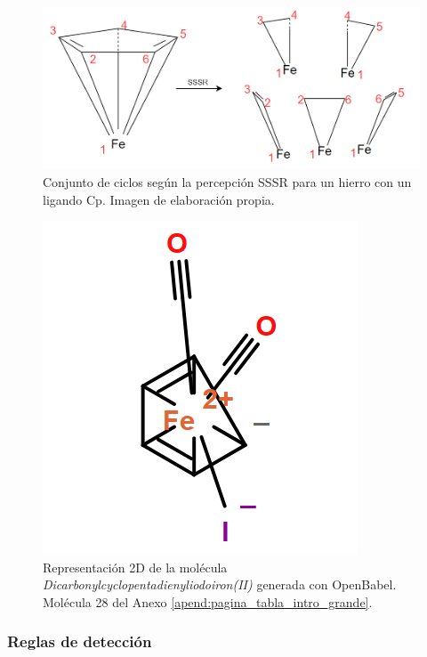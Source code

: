 \begin{figure}[h!]
    \centering
    \includegraphics[scale=0.4]{imagenes/diseno/dibujo/sssr_iron.png}
    \caption{Conjunto de ciclos según la percepción SSSR para un hierro con un ligando Cp. Imagen de elaboración propia.}
    \label{fig:sssr_iron(II)}
\end{figure}


\begin{figure}[h!]
    \centering
    \includegraphics[scale=0.5]{imagenes/diseno/dibujo/iron(II)_Original.png}
    \caption{Representación 2D de la molécula \textit{Dicarbonylcyclopentadienyliodoiron(II)} generada con OpenBabel. Molécula 28 del Anexo \ref{apend:pagina_tabla_intro_grande}.}
    \label{fig:iron(II)Original}
\end{figure}

\subsubsection{Reglas de detección} \label{reglas_deteccion_cp}

